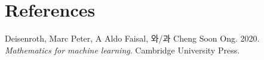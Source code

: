 \documentclass[
  11pt,
  a4paper,
  oneside]{scrbook}
\newlength{\cslhangindent}
\newenvironment{CSLReferences}[2] %
 {\begin{list}{}{%
  \setlength{\itemindent}{0pt}
  \setlength{\leftmargin}{0pt}
  \setlength{\parsep}{0pt}
  \ifodd #1
   \setlength{\leftmargin}{\cslhangindent}
   \setlength{\itemindent}{-1\cslhangindent}
  \fi
  \setlength{\itemsep}{#2\baselineskip}}}
 {\end{list}}
\theoremstyle{definition}
\theoremstyle{definition}
\theoremstyle{plain}
\theoremstyle{remark}
\begin{document}

\chapter*{References}\label{references}


\label{refs}
\begin{CSLReferences}{1}{0}
Deisenroth, Marc Peter, A Aldo Faisal, 와/과 Cheng Soon Ong. 2020.
\emph{Mathematics for machine learning}. Cambridge University Press.

\end{CSLReferences}


\backmatter
\end{document}
